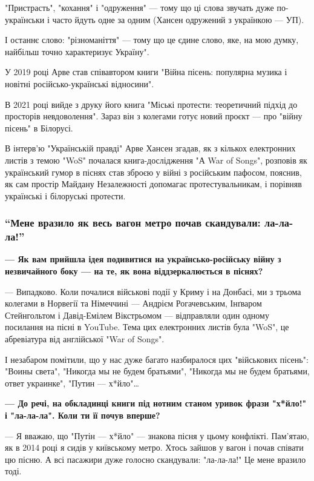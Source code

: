 "Пристрасть", "кохання" і "одруження" — тому що ці слова звучать дуже
по-українськи і часто йдуть одне за одним (Хансен одружений з українкою — УП). 

І останнє слово: "різноманіття" — тому що це єдине слово, яке, на мою думку,
найбільш точно характеризує Україну".

У 2019 році Арве став співавтором книги "Війна пісень: популярна музика і
новітні російсько-українські відносини". 

В 2021 році вийде з друку його книга "Міські протести: теоретичний підхід до
просторів невдоволення". Зараз він з колегами готує новий проєкт — про "війну
пісень" в Білорусі. 

В інтерв’ю "Українській правді" Арве Хансен згадав, як з кількох електронних
листів з темою "WoS" почалася книга-дослідження "А War of Songs", розповів як
український гумор в піснях став зброєю у війні з російським пафосом, пояснив,
як сам простір Майдану Незалежності допомагає протестувальникам, і порівняв
українські і білоруські протести. 


\subsubsection{\enquote{Мене вразило як весь вагон метро почав скандували: ла-ла-ла!}}

\textbf{— Як вам прийшла ідея подивитися на українсько-російську війну з незвичайного
боку — на те, як вона віддзеркалюється в піснях?} 

— Випадково. Коли почалися військові події у Криму і на Донбасі, ми з трьома
колегами в Норвегії та Німеччині — Андрієм Рогачевським, Інґваром Стейнгольтом
і Давід-Емілем Вікстрьомом — відправляли один одному посилання на пісні в
YouTube. Тема цих електронних листів була "WoS", це абревіатура від англійської
"War of Songs".

І незабаром помітили, що у нас дуже багато назбиралося цих "військових пісень":
"Воины света", "Никогда мы не будем братьями", "Никогда мы не будем братьями,
ответ украинке", "Путин — х*йло"…

\textbf{— До речі, на обкладинці книги під нотним станом уривок фрази "х*йло!" і
"ла-ла-ла". Коли ти її почув вперше?}

— Я вважаю, що "Путін — х*йло" — знакова пісня у цьому конфлікті. Пам’ятаю, як
в 2014 році я сидів у київському метро. Хтось зайшов у вагон і почав співати цю
пісню. А всі пасажири дуже голосно скандували: "ла-ла-ла!" Це мене вразило
тоді.

